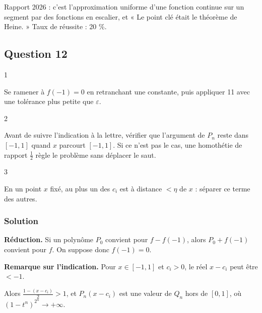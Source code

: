 \documentclass[11pt,a4paper]{article}
\begin{document}
\begin{jury}

Rapport 2026 : c'est l'approximation uniforme d'une fonction continue sur un segment par des fonctions en escalier, et « Le point clé était le théorème de Heine. » Taux de réussite : 20 \%.

\end{jury}

\hypertarget{question-12}{%
\subsection{Question 12}\label{question-12}}

\begin{indication}{1}

Se ramener à \(f(-1)=0\) en retranchant une constante, puis appliquer 11 avec une tolérance plus petite que \(\varepsilon\).

\end{indication}

\begin{indication}{2}

Avant de suivre l'indication à la lettre, vérifier que l'argument de \(P_n\) reste dans \([-1,1]\) quand \(x\) parcourt \([-1,1]\). Si ce n'est pas le cas, une homothétie de rapport \(\frac12\) règle le problème sans déplacer le saut.

\end{indication}

\begin{indication}{3}

En un point \(x\) fixé, au plus un des \(c_i\) est à distance \(<\eta\) de \(x\) : séparer ce terme des autres.

\end{indication}

\hypertarget{solution-21}{%
\subsubsection{Solution}\label{solution-21}}

\textbf{Réduction.} Si un polynôme \(P_0\) convient pour \(f-f(-1)\), alors \(P_0+f(-1)\) convient pour \(f\). On suppose donc \(f(-1)=0\).

\textbf{Remarque sur l'indication.} Pour \(x\in[-1,1]\) et \(c_i>0\), le réel \(x-c_i\) peut être \(<-1\).

Alors \(\frac{1-(x-c_i)}2>1\), et \(P_n(x-c_i)\) est une valeur de \(Q_n\) hors de \([0,1]\), où \((1-t^n)^{2^n}\to+\infty\).
\end{document}
